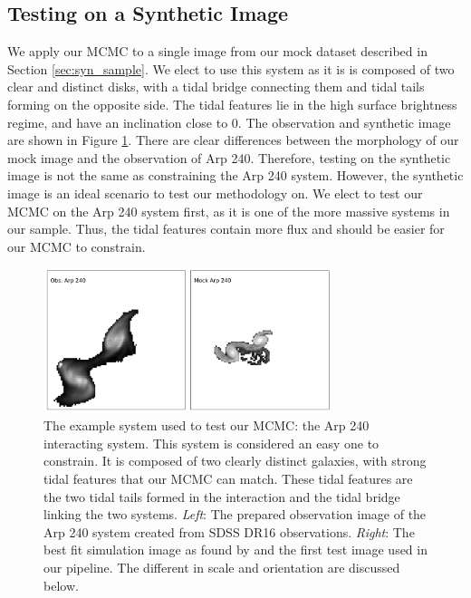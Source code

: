 \subsection{Testing on a Synthetic Image}
We apply our MCMC to a single image from our mock dataset described in Section \ref{sec:syn_sample}. We elect to use this system as it is is composed of two clear and distinct disks, with a tidal bridge connecting them and tidal tails forming on the opposite side. The tidal features lie in the high surface brightness regime, and have an inclination close to 0. The observation and synthetic image are shown in Figure \ref{fig:arp240}. There are clear differences between the morphology of our mock image and the observation of Arp 240. Therefore, testing on the synthetic image is not the same as constraining the Arp 240 system. However, the synthetic image is an ideal scenario to test our methodology on. We elect to test our MCMC on the Arp 240 system first, as it is one of the more massive systems in our sample. Thus, the tidal features contain more flux and should be easier for our MCMC to constrain.

\begin{figure}
    \centering
    \includegraphics[width=0.75\textwidth]{Chapter1/figures/arp240-obs-sim.pdf}
    \caption[The example system used to test our MCMC: the Arp 240 interacting system.]{The example system used to test our MCMC: the Arp 240 interacting system. This system is considered an easy one to constrain. It is composed of two clearly distinct galaxies, with strong tidal features that our MCMC can match. These tidal features are the two tidal tails formed in the interaction and the tidal bridge linking the two systems. \textit{Left}: The prepared observation image of the Arp 240 system created from SDSS DR16 observations. \textit{Right}: The best fit simulation image as found by \citet{2016MNRAS.459..720H} and the first test image used in our pipeline. The different in scale and orientation are discussed below.}
    \label{fig:arp240}
\end{figure}


